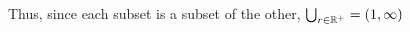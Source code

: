 \documentclass[10pt]{exam}
\begin{document}
\begin{enumerate}
\begin{enumerate}

        Thus, since each subset is a subset of the other, $\bigcup_{r\in \mathbb R^+} = (1, \infty)$
    \end{enumerate}




    
\end{enumerate}

    
\end{document}
